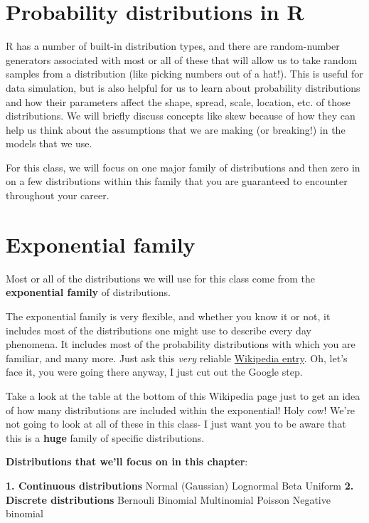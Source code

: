 \documentclass[
]{book}
\begin{document}
\hypertarget{probability-distributions-in-r}{%
\section{Probability distributions in R}\label{probability-distributions-in-r}}

R has a number of built-in distribution types, and there are random-number generators associated with most or all of these that will allow us to take random samples from a distribution (like picking numbers out of a hat!). This is useful for data simulation, but is also helpful for us to learn about probability distributions and how their parameters affect the shape, spread, scale, location, etc. of those distributions. We will briefly discuss concepts like skew because of how they can help us think about the assumptions that we are making (or breaking!) in the models that we use.

For this class, we will focus on one major family of distributions and then zero in on a few distributions within this family that you are guaranteed to encounter throughout your career.

\hypertarget{exponential-family}{%
\section{Exponential family}\label{exponential-family}}

Most or all of the distributions we will use for this class come from the \textbf{exponential family} of distributions.

The exponential family is very flexible, and whether you know it or not, it includes most of the distributions one might use to describe every day phenomena. It includes most of the probability distributions with which you are familiar, and many more. Just ask this \emph{very} reliable \href{https://en.wikipedia.org/wiki/Exponential_family}{Wikipedia entry}. Oh, let's face it, you were going there anyway, I just cut out the Google step.

Take a look at the table at the bottom of this Wikipedia page just to get an idea of how many distributions are included within the exponential! Holy cow! We're not going to look at all of these in this class- I just want you to be aware that this is a \textbf{huge} family of specific distributions.

\textbf{Distributions that we'll focus on in this chapter}:

\textbf{1. Continuous distributions}
Normal (Gaussian)
Lognormal
Beta
Uniform
\textbf{2. Discrete distributions}
Bernouli
Binomial
Multinomial
Poisson
Negative binomial
\end{document}
